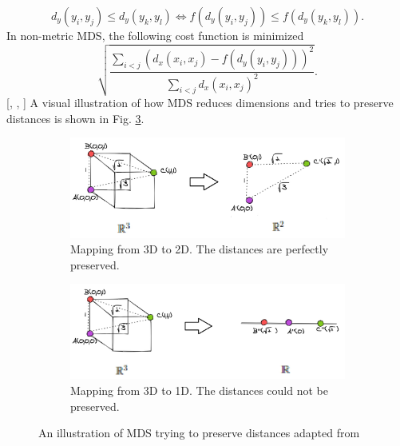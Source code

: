 \begin{equation}
    d_y(y_i,y_j) \leq d_y(y_k,y_l) \Longleftrightarrow f(d_y(y_i,y_j)) \leq f(d_y(y_k,y_l)).
\end{equation}
In non-metric MDS, the following cost function is minimized
\begin{equation}
    \sqrt{ \frac{\sum_{i<j} (d_x(x_i,x_j) - f(d_y(y_i,y_j)))^2}{\sum_{i<j} d_x(x_i,x_j)^2}  }.
\end{equation}
[\cite{ghojogh20}, \cite{sorzano14}, \cite{Gisbrecht15}]
A visual illustration of how MDS reduces dimensions and tries to preserve distances is shown in Fig. \ref{fig:mds_illustration}.
\begin{figure}[!]
     \centering
     \begin{subfigure}[t]{\columnwidth}
         \centering
         \includegraphics[width=\columnwidth]{images/mds_3D_2D.jpg}
         \caption{Mapping from 3D to 2D. The distances are perfectly preserved.}
         \label{subfig:mds_3D_2D}
     \end{subfigure}
     \hfill
     \begin{subfigure}[t]{\columnwidth}
         \centering
         \includegraphics[width=\columnwidth]{images/mds_3D_1D.jpg}
         \caption{Mapping from 3D to 1D. The distances could not be preserved.}
         \label{subfig:mds_3D_1D}
     \end{subfigure}
        \caption[Illustration of MDS]{An illustration of MDS trying to preserve distances adapted from \footnotemark}
        \label{fig:mds_illustration}
\end{figure}

